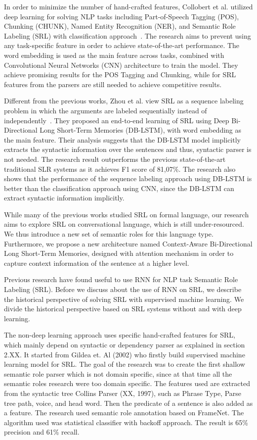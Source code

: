 In order to minimize the number of hand-crafted features, Collobert et al. utilized deep learning for solving NLP tasks including Part-of-Speech Tagging (POS), Chunking (CHUNK), Named Entity Recognition (NER), and Semantic Role Labeling (SRL) with classification approach~\cite{collobert2011natural}. The research aims to prevent using any task-specific feature in order to achieve state-of-the-art performance. The word embedding is used as the main feature across tasks, combined with Convolutional Neural Networks (CNN) architecture to train the model. They achieve promising results for the POS Tagging and Chunking, while for SRL features from the parsers are still needed to achieve competitive results.

Different from the previous works, Zhou et al. view SRL as a sequence labeling problem in which the arguments are labeled sequentially instead of independently~\cite{zhou2015end}. They proposed an end-to-end learning of SRL using Deep Bi-Directional Long Short-Term Memories (DB-LSTM), with word embedding as the main feature. Their analysis suggests that the DB-LSTM model implicitly extracts the syntactic information over the sentences and thus, syntactic parser is not needed. The research result outperforms the previous state-of-the-art traditional SLR systems as it achieves F1 score of 81,07\%. The research also shows that the performance of the sequence labeling approach using DB-LSTM is better than the classification approach using CNN, since the DB-LSTM can extract syntactic information implicitly.

While many of the previous works studied SRL on formal language, our research aims to explore SRL on conversational language, which is still under-resourced. We thus introduce a new set of semantic roles for this language type. Furthermore, we propose a new architecture named Context-Aware Bi-Directional Long Short-Term Memories, designed with attention mechanism in order to capture context information of the sentence at a higher level.

Previous research have found useful to use RNN for NLP task Semantic Role Labeling (SRL). Before we discuss about the use of RNN on SRL, we describe the historical perspective of solving SRL with supervised machine learning. We divide the historical perspective based on SRL systems without and with deep learning.

The non-deep learning approach uses specific hand-crafted features for SRL, which mainly depend on syntactic or dependency parser as explained in section 2.XX. It started from Gildea et. Al (2002) who firstly build supervised machine learning model for SRL. The goal of the research was to create the first shallow semantic role parser which is not domain specific, since at that time all the semantic roles research were too domain specific. The features used are extracted from the syntactic tree Collins Parser (XX, 1997), such as Phrase Type, Parse tree path, voice, and head word. Then the predicate of a sentence is also added as a feature. The research used semantic role annotation based on FrameNet. The algorithm used was statistical classifier with backoff approach. The result is 65\% precision and 61\% recall.

